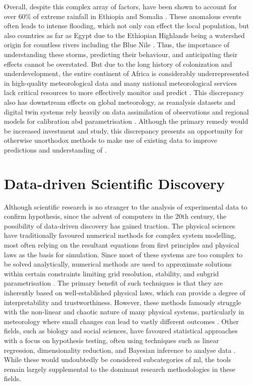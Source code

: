 Overall, despite this complex array of factors,  have been shown to account for over 60\% of extreme rainfall in Ethiopia and Somalia \citep{Hill2023}. These anomalous events often leads to intense flooding, which not only can effect the local population, but also countries as far as Egypt due to the Ethiopian Highlands being a watershed origin for countless rivers including the Blue Nile \citep{Legese2020,Zaroug2014}. Thus, the importance of understanding these storms, predicting their behaviour, and anticipating their effects cannot be overstated. But due to the long history of colonization and underdevelopment, the entire continent of Africa is considerably underrepresented in high-quality meteorological data and many national meteorological services lack critical resources to more effectively monitor and predict  . This discrepancy also has downstream effects on global meteorology, as reanalysis datasets and digital twin systems rely heavily on data assimilation of observations and regional models for calibration abd parametrisation . Although the primary remedy would be increased investment and study, this discrepancy presents an opportunity for otherwise unorthodox methods to make use of existing data to improve predictions and understanding of .

\section{Data-driven Scientific Discovery}

Although scientific research is no stranger to the analysis of experimental data to confirm hypothesis, since the advent of computers in the 20th century, the possibility of data-driven discovery has gained traction. The physical sciences have traditionally favoured numerical methods for complex system modelling, most often relying on the resultant equations from first principles and physical laws as the basis for simulation. Since most of these systems are too complex to be solved analytically, numerical methods are used to approximate solutions within certain constraints limiting grid resolution, stability, and subgrid parametrisation \citep{Lynch2008}. The primary benefit of such techniques is that they are inherently based on well-established physical laws, which can provide a degree of interpretability and trustworthiness. However, these methods famously struggle with the non-linear and chaotic nature of many physical systems, particularly in meteorology where small changes can lead to vastly different outcomes \citep{Lorenz1963}. Other fields, such as biology and social sciences, have favoured statistical approaches with a focus on hypothesis testing, often using techniques such as linear regression, dimensionality reduction, and Bayesian inference to analyse data . While these would undoubtedly be considered subcategories of \acrshort{ml}, the tools remain largely supplemental to the dominant research methodologies in these fields.

